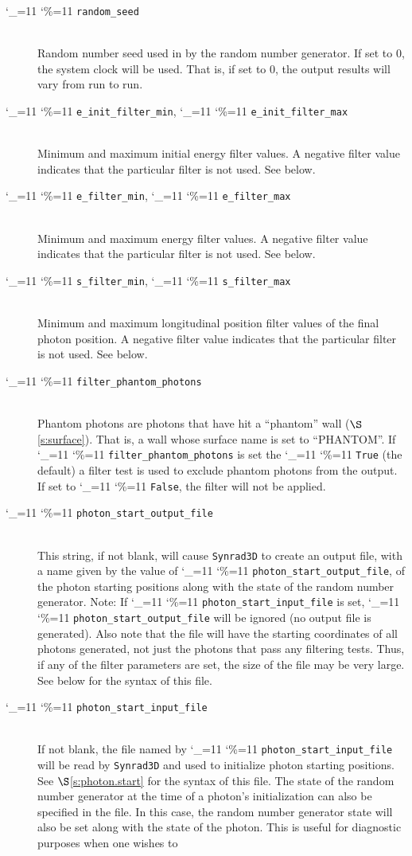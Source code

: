 \documentclass[11pt,openany]{report}
\newcommand{\sref}[1]{$\S$\ref{#1}}
\newcommand{\srthree}{\texttt{Synrad3D}\xspace}
\newcommand\ttcmd{\begingroup\catcode`\_=11 \catcode`\%=11 \dottcmd}
\newcommand\dottcmd[1]{\texttt{#1}\endgroup}
\newcommand{\vn}{\ttcmd}
\newcommand{\Newline}{\hfil \\}
\begin{document}
\begin{description}
  \item[\vn{random_seed}] \Newline
Random number seed used in by the random number generator. If set to 0, the system clock
will be used. That is, if set to 0, the output results will vary from run to run. 
  \item[\vn{e_init_filter_min}, \vn{e_init_filter_max}] \Newline
Minimum and maximum initial energy filter values. A negative filter value
indicates that the particular filter is not used. See below.
  \item[\vn{e_filter_min}, \vn{e_filter_max}] \Newline
Minimum and maximum energy filter values. A negative filter value
indicates that the particular filter is not used. See below.
  \item[\vn{s_filter_min}, \vn{s_filter_max}] \Newline
Minimum and maximum longitudinal position filter values of the final
photon position. A negative filter value indicates that the particular
filter is not used. See below.
  \item[\vn{filter_phantom_photons}] \Newline
Phantom photons are photons that have hit a ``phantom'' wall (\sref{s:surface}).  That is,
a wall whose surface name is set to ``PHANTOM''. If \vn{filter_phantom_photons} is set the
\vn{True} (the default) a filter test is used to exclude phantom photons from the output.
If set to \vn{False}, the filter will not be applied.
  \item[\vn{photon_start_output_file}] \Newline
This string, if not blank, will cause \srthree to create an output
file, with a name given by the value of \vn{photon_start_output_file},
of the photon starting positions along with the state of the random
number generator. Note: If \vn{photon_start_input_file} is set,
\vn{photon_start_output_file} will be ignored (no output file is
generated). Also note that the file will have the starting coordinates
of all photons generated, not just the photons that pass any filtering
tests. Thus, if any of the filter parameters are set, the size of the
file may be very large. See below for the syntax of this file.
  \item[\vn{photon_start_input_file}] \Newline
If not blank, the file named by \vn{photon_start_input_file}
will be read by \srthree and used to initialize photon
starting positions. See \sref{s:photon.start} for the syntax of this file.
The state of the random number generator at the time of a photon's
initialization can also be specified in the file. In this case, the
random number generator state will also be set along with the state of
the photon. This is useful for diagnostic purposes when one wishes to

\end{description}
\end{document}
